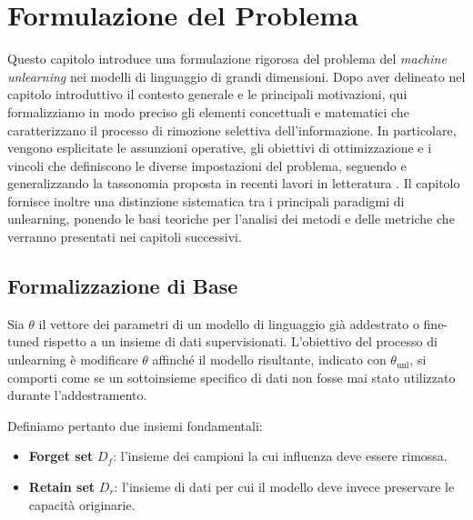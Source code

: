 \chapter{Formulazione del Problema}
\label{chap:problem_formulation}
Questo capitolo introduce una formulazione rigorosa del problema del \emph{machine unlearning} nei modelli di linguaggio di grandi dimensioni. 
Dopo aver delineato nel capitolo introduttivo il contesto generale e le principali motivazioni, qui formalizziamo in modo preciso gli elementi concettuali e matematici che caratterizzano il processo di rimozione selettiva dell’informazione. 
In particolare, vengono esplicitate le assunzioni operative, gli obiettivi di ottimizzazione e i vincoli che definiscono le diverse impostazioni del problema, seguendo e generalizzando la tassonomia proposta in recenti lavori in letteratura \cite{liu2024rethinkingmachineunlearninglarge, openunlearning2025, geng2025comprehensivesurveymachineunlearning}. 
Il capitolo fornisce inoltre una distinzione sistematica tra i principali paradigmi di unlearning, ponendo le basi teoriche per l’analisi dei metodi e delle metriche che verranno presentati nei capitoli successivi.

\medskip

\section{Formalizzazione di Base}

Sia $\theta$ il vettore dei parametri di un modello di linguaggio già addestrato o fine-tuned rispetto a un insieme di dati supervisionati. L’obiettivo del processo di unlearning è modificare $\theta$ affinché il modello risultante, indicato con $\theta_{\mathrm{unl}}$, si comporti come se un sottoinsieme specifico di dati non fosse mai stato utilizzato durante l’addestramento.

Definiamo pertanto due insiemi fondamentali:
\begin{itemize}
    \item \textbf{Forget set} $D_f$: l’insieme dei campioni la cui influenza deve essere rimossa.
    \item \textbf{Retain set} $D_r$: l’insieme di dati per cui il modello deve invece preservare le capacità originarie.
\end{itemize}

